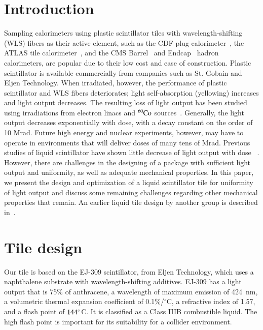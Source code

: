 \documentclass[review]{elsarticle}
\begin{document}
\linenumbers

\section{Introduction}
Sampling calorimeters using plastic scintillator tiles with
wavelength-shifting (WLS) fibers as their active element, such as the CDF plug
calorimeter~\cite{Aota1995557}, the ATLAS tile calorimeter~\cite{atlastile}, 
and the CMS Barrel~\cite{CMSHB} and
Endcap~\cite{HCALTDR1997} hadron calorimeters, are popular due to their
low cost and ease of construction. Plastic scintillator is available
commercially from companies such as St. Gobain and Eljen Technology. When
irradiated, however, the performance of plastic scintillator and WLS
fibers deteriorates; light self-absorption (yellowing) increases and
light output decreases. The resulting loss of light output 
has been studied using irradiations
from electron linacs and ${\rm ^{60}Co}$ sources~\cite{vasken,ByonWagner1993263}.
Generally, the light output decreases exponentially with dose, with a
decay constant on the order of 10 Mrad. Future high energy and nuclear
experiments, however, may have to operate in environments that will
deliver doses of many tens of Mrad.
Previous studies of liquid scintillator have shown little decrease
of light output with dose ~\cite{zornliquid,Klein1967399,berlman}.
However, there are challenges in the designing of a package
with sufficient light output and uniformity, as well as 
adequate mechanical properties.
In this paper, we present the design
and optimization of a liquid scintillator tile for uniformity
of light output and discuss some remaining challenges regarding
other mechanical properties that remain.
An earlier liquid tile design by another group is described in~\cite{liquidrandy}.

\section{Tile design}
\label{sec:design}
Our tile is based on the EJ-309 scintillator, from Eljen Technology, which
uses a naphthalene substrate with wavelength-shifting additives.
EJ-309 has a light output that is 75\% of anthracene, a wavelength of
maximum emission of 424~nm, a volumetric thermal expansion coefficient
of 0.1\%/$^\circ$C,
a refractive index of 1.57, and a flash
point of $\rm{144^\circ}$C. It is classified as a Class IIIB combustible liquid.
The high flash point is important for its
suitability for a collider environment.
\end{document}
